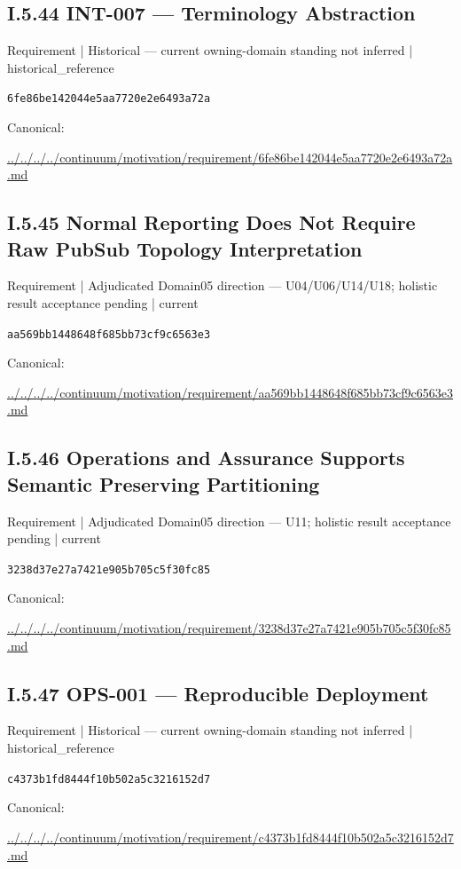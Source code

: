 \documentclass[10pt,a4paper]{article}
\begin{document}
\subsection*{I.5.44 INT-007 — Terminology Abstraction}
\label{element-6fe86be142044e5aa7720e2e6493a72a}
{\small Requirement | Historical — current owning-domain standing not inferred | historical\_reference}\par
\texttt{6fe86be142044e5aa7720e2e6493a72a}\par
Canonical: \par
{\footnotesize\url{../../../../continuum/motivation/requirement/6fe86be142044e5aa7720e2e6493a72a.md}}\par
\subsection*{I.5.45 Normal Reporting Does Not Require Raw PubSub Topology Interpretation}
\label{element-aa569bb1448648f685bb73cf9c6563e3}
{\small Requirement | Adjudicated Domain05 direction — U04/U06/U14/U18; holistic result acceptance pending | current}\par
\texttt{aa569bb1448648f685bb73cf9c6563e3}\par
Canonical: \par
{\footnotesize\url{../../../../continuum/motivation/requirement/aa569bb1448648f685bb73cf9c6563e3.md}}\par
\subsection*{I.5.46 Operations and Assurance Supports Semantic Preserving Partitioning}
\label{element-3238d37e27a7421e905b705c5f30fc85}
{\small Requirement | Adjudicated Domain05 direction — U11; holistic result acceptance pending | current}\par
\texttt{3238d37e27a7421e905b705c5f30fc85}\par
Canonical: \par
{\footnotesize\url{../../../../continuum/motivation/requirement/3238d37e27a7421e905b705c5f30fc85.md}}\par
\subsection*{I.5.47 OPS-001 — Reproducible Deployment}
\label{element-c4373b1fd8444f10b502a5c3216152d7}
{\small Requirement | Historical — current owning-domain standing not inferred | historical\_reference}\par
\texttt{c4373b1fd8444f10b502a5c3216152d7}\par
Canonical: \par
{\footnotesize\url{../../../../continuum/motivation/requirement/c4373b1fd8444f10b502a5c3216152d7.md}}\par
\end{document}
